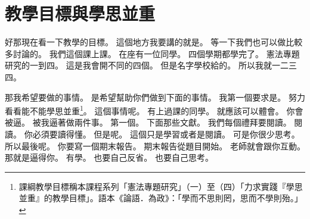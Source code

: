 \section{教學目標與學思並重}

\hypertarget{w01:cue:34}{}好那現在看一下教學的目標。
\hypertarget{w01:cue:35}{}這個地方我要講的就是。
\hypertarget{w01:cue:36}{}等一下我們也可以做比較多討論的。
\hypertarget{w01:cue:37}{}我們這個課上課。
\hypertarget{w01:cue:38}{}在座有一位同學。
\hypertarget{w01:cue:39}{}四個學期都學完了。
\hypertarget{w01:cue:40}{}憲法專題研究的一到四。
\hypertarget{w01:cue:41}{}這是我會開不同的四個。
\hypertarget{w01:cue:42}{}但是名字學校給的。
\hypertarget{w01:cue:43}{}所以我就一二三四。

\hypertarget{w01:cue:44}{}那我希望要做的事情。
\hypertarget{w01:cue:45}{}是希望幫助你們做到下面的事情。
\hypertarget{w01:cue:46}{}我第一個要求是。
\hypertarget{w01:cue:47}{}努力看看能不能學思並重\footnote{課綱教學目標稱本課程系列「憲法專題研究」（一）至（四）「力求實踐『學思並重』的教學目標」。語本《論語．為政》：「學而不思則罔，思而不學則殆。」}。
\hypertarget{w01:cue:48}{}這個事情呢。
\hypertarget{w01:cue:49}{}有上過課的同學。
\hypertarget{w01:cue:50}{}就應該可以體會。
\hypertarget{w01:cue:51}{}你會被逼。
\hypertarget{w01:cue:52}{}被我逼著做兩件事。
\hypertarget{w01:cue:53}{}第一個。
\hypertarget{w01:cue:54}{}下面那些文獻。
\hypertarget{w01:cue:55}{}我們每個禮拜要閱讀。
\hypertarget{w01:cue:56}{}閱讀。
\hypertarget{w01:cue:57}{}你必須要讀得懂。
\hypertarget{w01:cue:58}{}但是呢。
\hypertarget{w01:cue:59}{}這個只是學習或者是閱讀。
\hypertarget{w01:cue:60}{}可是你很少思考。
\hypertarget{w01:cue:61}{}所以最後呢。
\hypertarget{w01:cue:62}{}你要寫一個期末報告。
\hypertarget{w01:cue:63}{}期末報告從題目開始。
\hypertarget{w01:cue:64}{}老師就會跟你互動。
\hypertarget{w01:cue:65}{}那就是逼得你。
\hypertarget{w01:cue:66}{}有學。
\hypertarget{w01:cue:67}{}也要自己反省。
\hypertarget{w01:cue:68}{}也要自己思考。

